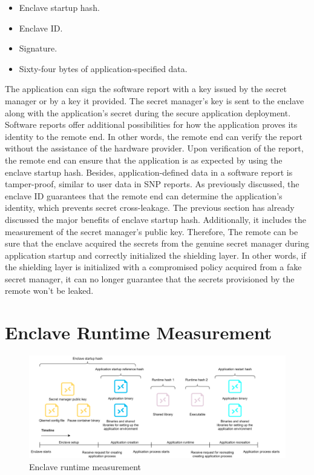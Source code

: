 \begin{itemize}
    \item Enclave startup hash.
    \item Enclave ID.
    \item Signature.
    \item Sixty-four bytes of application-specified data.
\end{itemize}

The application can sign the software report with a key issued by the secret manager or by a key it provided. The secret manager's key is sent to the enclave along with the application's secret during the secure application deployment. Software reports offer additional possibilities 
for how the application proves its identity to the remote end. In other words, the remote end can verify the report without the assistance of the hardware provider. Upon verification of the report, the remote end can ensure that the application is as expected by using the enclave startup 
hash. Besides, application-defined data in a software report is tamper-proof, similar to user data in SNP reports. As previously discussed, the enclave ID guarantees that the remote end can determine the application's identity, which prevents secret cross-leakage. The previous 
section has already discussed the major benefits of enclave startup hash. Additionally, it includes the measurement of the secret manager's public key. Therefore, The remote can be sure that the enclave acquired the secrets from the genuine secret manager during application startup and 
correctly initialized the shielding layer. In other words, if the shielding layer is initialized with a compromised policy acquired from a fake secret manager, it can no longer guarantee that the secrets provisioned by the remote won't be leaked.




\section{Enclave Runtime Measurement}
\label{sec:Enclave_Runtime_Measurement}
\begin{figure}[!htb]
    \centering
    \includegraphics[width=1\textwidth]{images/soft_ware_manager_meausrment.png}
    \caption[Enclave runtime measurement]{Enclave runtime measurement}
    \label{fig:soft_ware_manager_meausrment}
\end{figure}

